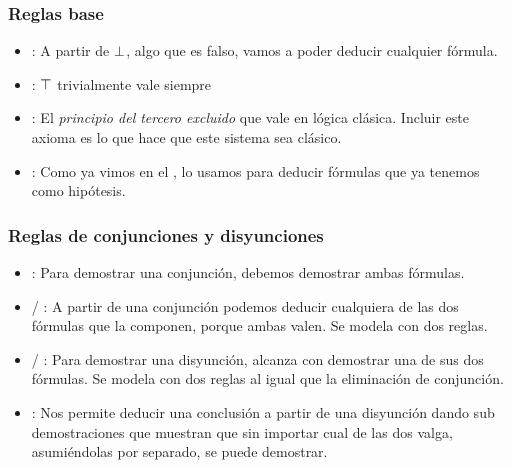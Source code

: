 \subsubsection{Reglas base}

\begin{multicols}{2}
    \proofTreeFalseE
    \proofTreeTrueI
\end{multicols}

\begin{multicols}{2}
    \proofTreeLEM
    \proofTreeAx
\end{multicols}

\begin{itemize}
    \item {}: A partir de $\bot$, algo que es falso, vamos a poder deducir cualquier
    fórmula.
    \item {}: $\top$ trivialmente vale siempre
    \item {}: El \textit{principio del tercero excluido} que vale en
    lógica clásica. Incluir este axioma es lo que hace que este sistema sea
    clásico.
    \item {}: Como ya vimos en el , lo usamos para
    deducir fórmulas que ya tenemos como hipótesis.
\end{itemize}

\subsubsection{Reglas de conjunciones y disyunciones}

\proofTreeAndI

\begin{multicols}{2}
    \proofTreeAndEOne
    \proofTreeAndETwo
\end{multicols}

\begin{multicols}{2}
    \proofTreeOrIOne
    \proofTreeOrITwo
\end{multicols}

\proofTreeOrE

\begin{itemize}
    \item {}: Para demostrar una conjunción, debemos demostrar ambas fórmulas.
    \item {} / : A partir de una conjunción podemos
    deducir cualquiera de las dos fórmulas que la componen, porque ambas valen.
    Se modela con dos reglas.
    \item {} / : Para demostrar una disyunción, alcanza con
    demostrar una de sus dos fórmulas. Se modela con dos reglas al igual que la
    eliminación de conjunción.
    \item {}: Nos permite deducir una conclusión a partir de una
    disyunción dando sub demostraciones que muestran que sin importar cual de
    las dos valga, asumiéndolas por separado, se puede demostrar.
\end{itemize}


